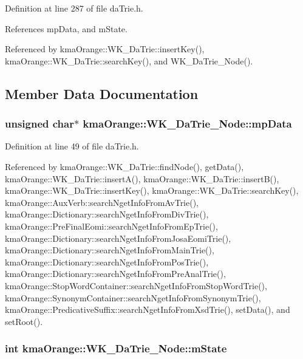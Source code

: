 Definition at line 287 of file daTrie.h.

References mpData, and mState.

Referenced by kmaOrange::WK\_\-DaTrie::insertKey(), kmaOrange::WK\_\-DaTrie::searchKey(), and WK\_\-DaTrie\_\-Node().

\subsection{Member Data Documentation}
\hypertarget{classkmaOrange_1_1WK__DaTrie__Node_618a7bf2137a1996a15da4b572ce1807}{
\subsubsection[{mpData}]{\setlength{\rightskip}{0pt plus 5cm}unsigned char$\ast$ {\bf kmaOrange::WK\_\-DaTrie\_\-Node::mpData}}}
\label{classkmaOrange_1_1WK__DaTrie__Node_618a7bf2137a1996a15da4b572ce1807}




Definition at line 49 of file daTrie.h.

Referenced by kmaOrange::WK\_\-DaTrie::findNode(), getData(), kmaOrange::WK\_\-DaTrie::insertA(), kmaOrange::WK\_\-DaTrie::insertB(), kmaOrange::WK\_\-DaTrie::insertKey(), kmaOrange::WK\_\-DaTrie::searchKey(), kmaOrange::AuxVerb::searchNgetInfoFromAvTrie(), kmaOrange::Dictionary::searchNgetInfoFromDivTrie(), kmaOrange::PreFinalEomi::searchNgetInfoFromEpTrie(), kmaOrange::Dictionary::searchNgetInfoFromJosaEomiTrie(), kmaOrange::Dictionary::searchNgetInfoFromMainTrie(), kmaOrange::Dictionary::searchNgetInfoFromPosTrie(), kmaOrange::Dictionary::searchNgetInfoFromPreAnalTrie(), kmaOrange::StopWordContainer::searchNgetInfoFromStopWordTrie(), kmaOrange::SynonymContainer::searchNgetInfoFromSynonymTrie(), kmaOrange::PredicativeSuffix::searchNgetInfoFromXsdTrie(), setData(), and setRoot().\hypertarget{classkmaOrange_1_1WK__DaTrie__Node_d2e9e3e2bb4456ad4851ade93fe63978}{
\subsubsection[{mState}]{\setlength{\rightskip}{0pt plus 5cm}int {\bf kmaOrange::WK\_\-DaTrie\_\-Node::mState}}}
\label{classkmaOrange_1_1WK__DaTrie__Node_d2e9e3e2bb4456ad4851ade93fe63978}




